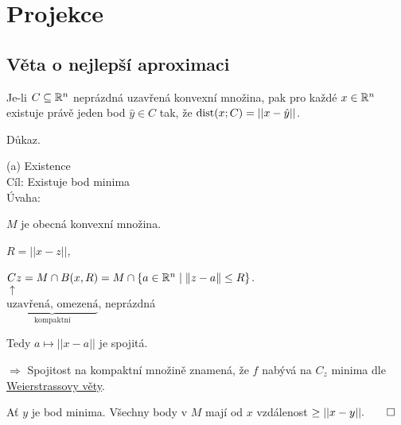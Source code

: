 \section{Projekce}

\subsection{Věta o nejlepší aproximaci}
Je-li $C \subseteq \mathbb{R}^n$ neprázdná uzavřená konvexní množina, pak pro každé $x \in \mathbb{R}^n$ existuje právě jeden bod 
$\hat y \in C$ tak, že $\operatorname*{dist} (x; C) = ||x-\hat y||$.

Důkaz.

(a) Existence\\
Cíl: Existuje bod minima\\
Úvaha:
\begin{multicols}{2}


    \begin{adjustwidth}{-2em}{0pt}
        $M$ je obecná konvexní množina.

        $R = ||x-z||$,

        $Cz = M \cap B (x, R) = M \cap \left\lbrace a \in \mathbb{R}^n \mid \|z-a\| \leq R \right\rbrace$.\\
        $\uparrow$\\
        $\underbrace{\text{uzavřená, omezená}}_\text{kompaktní}$, neprázdná

        Tedy $a \mapsto ||x-a||$ je spojitá.

        $\Rightarrow$ Spojitost na kompaktní množině znamená, že $f$ nabývá na $C_z$ minima dle 
        \href{https://cs.wikipedia.org/wiki/Weierstrassova_v%C4%9Bta}{Weierstrassovy věty}.
    \end{adjustwidth}
\end{multicols}
Ať $y$ je bod minima. Všechny body v $M$ mají od $x$ vzdálenost $\geq ||x-y||. \qed$

